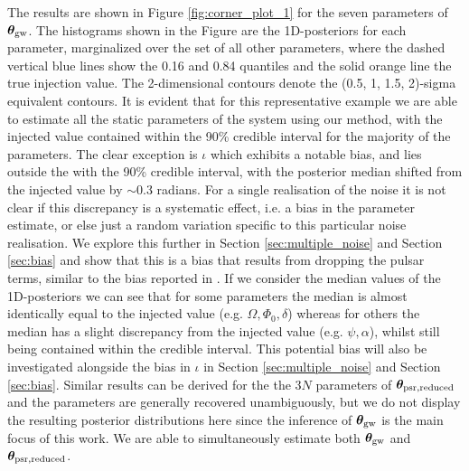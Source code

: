 \documentclass[fleqn,usenatbib,useAMS]{mnras}
\begin{document}
 The results are shown in Figure \ref{fig:corner_plot_1} for the seven parameters of  $\boldsymbol{\theta}_{\rm gw}$. The histograms shown in the Figure are the 1D-posteriors for each parameter, marginalized over the set of all other parameters, where the dashed vertical blue lines show the 0.16 and 0.84 quantiles and the solid orange line the true injection value. The 2-dimensional contours denote the (0.5, 1, 1.5, 2)-sigma equivalent contours. It is evident that for this representative example we are able to estimate all the static parameters of the system using our method, with the injected value contained within the 90\% credible interval for the majority of the parameters. The clear exception is $\iota$ which exhibits a notable bias, and lies outside the with the 90\% credible interval, with the posterior median shifted from the injected value by $\sim 0.3$ radians. For a single realisation of the noise it is not clear if this discrepancy is a systematic effect, i.e. a bias in the parameter estimate, or else just a random variation specific to this particular noise realisation. We explore this further in Section \ref{sec:multiple_noise} and Section \ref{sec:bias} and show that this is a bias that results from dropping the pulsar terms, similar to the bias reported in \cite{Zhupulsarterms}. If we consider the median values of the 1D-posteriors we can see that for some parameters the median is almost identically equal to the injected value  (e.g. $\Omega, \Phi_0, \delta$) whereas for others the median has a slight discrepancy from the injected value (e.g. $\psi, \alpha$), whilst still being contained within the credible interval. This potential bias will also be investigated alongside the bias in $\iota$ in Section \ref{sec:multiple_noise} and Section \ref{sec:bias}. Similar results can be derived for the the 3$N$ parameters of $\boldsymbol{\theta}_{\rm psr, reduced}$ and the parameters are generally recovered unambiguously, but we do not display the resulting posterior distributions here since the inference of $\boldsymbol{\theta}_{\rm gw}$ is the main focus of this work. We are able to simultaneously estimate both $\boldsymbol{\theta}_{\rm gw}$ and $\boldsymbol{\theta}_{\rm psr, reduced}$. 
 
\end{document}
